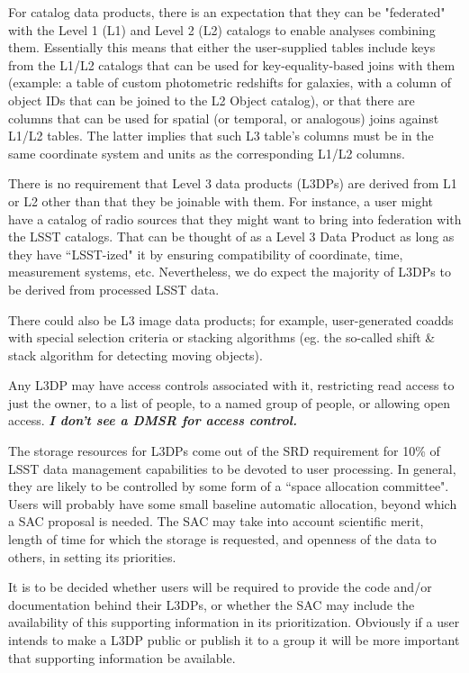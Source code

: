 \documentclass[12pt]{article}
\newcommand{\annotate}[1]{{\color{magenta}\large\textbf{\emph{#1}}}}
\newcommand{\req}[1]{\marginpar{\tiny #1}}
\newcommand{\dmreq}[1]{\req{DMS-REQ-#1}}
\begin{document}
For catalog data products, there is an expectation that they can be "federated" with the Level 1 (L1) and Level 2 (L2) catalogs to enable analyses combining them.  Essentially this means that either the user-supplied tables include keys from the L1/L2 catalogs that can be used for key-equality-based joins with them (example: a table of custom photometric redshifts for galaxies, with a column of object IDs that can be joined to the L2 Object catalog), or that there are columns that can be used for spatial (or temporal, or analogous) joins against L1/L2 tables. The latter implies that such L3 table's columns must be in the same coordinate system and units as the corresponding L1/L2 columns.
\dmreq{0123}
\dmreq{0124}

There is no requirement that Level 3 data products (L3DPs) are derived from L1 or L2 other than that they be joinable with them.  For instance, a user might have a catalog of radio sources that they might want to bring into federation with the LSST catalogs. That can be thought of as a Level 3 Data Product as long as they have ``LSST-ized" it by ensuring compatibility of coordinate, time, measurement systems, etc.  Nevertheless, we do expect the majority of L3DPs to be derived from processed LSST data.

There could also be L3 image data products; for example, user-generated coadds with special selection criteria or stacking algorithms (eg. the so-called shift \& stack algorithm for detecting moving objects).
\dmreq{0127}

Any L3DP may have access controls associated with it, restricting read access to just the owner, to a list of people, to a named group of people, or allowing open access.
\annotate{I don't see a DMSR for access control.}

The storage resources for L3DPs come out of the SRD requirement for 10\% of LSST data management capabilities to be devoted to user processing. In general, they are likely to be controlled by some form of a ``space allocation committee".  Users will probably have some small baseline automatic allocation, beyond which a SAC proposal is needed. The SAC may take into account scientific merit, length of time for which the storage is requested, and openness of the data to others, in setting its priorities.
\dmreq{0119}

It is to be decided whether users will be required to provide the code and/or documentation behind their L3DPs, or whether the SAC may include the availability of this supporting information in its prioritization.  Obviously if a user intends to make a L3DP public or publish it to a group it will be more important that supporting information be available.
\end{document}
